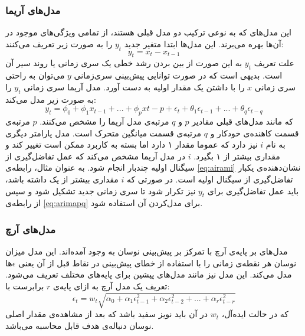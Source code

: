 \subsubsection{مدل‌های آریما}
این مدل‌های که به نوعی ترکیب دو مدل قبلی هستند، از تمامی ویژگی‌های موجود در آن‌ها بهره می‌برند. این مدل‌ها ابتدا متغیر جدید $y_t$ را به صورت زیر تعریف می‌کنند:
\begin{equation}
	\label{eq:airami}
	y_t = x_t - x_{t-1}
\end{equation}
علت تعریف $y_t$  به این صورت از بین بردن رشد خطی یک سری زمانی یا روند سیر آن است. بدیهی است که در صورت توانایی پیش‌بینی سری‌زمانی $y$ می‌توان به راحتی سری زمانی $x$ را با داشتن یک مقدار اولیه به دست آورد. مدل آریما سری زمانی $y_t$ را به صورت زیر مدل می‌کند:
\begin{equation}
	\label{eq:arimapq}
	y_t = \phi_0 + \phi_1 x_{t-1} + ... + \phi_p x{t-p} + \epsilon_t + \theta_1 \epsilon_{t-1} + ... + \theta_q \epsilon_{t-q}
\end{equation}
که مانند مدل‌های قبلی مقادیر $p$ و $q$ مرتبه‌ی مدل آریما را مشخص می‌کنند. $p$ مرتبه‌ی قسمت کاهنده‌ی خودکار و $q$ مرتبه‌ی قسمت میانگین متحرک است. مدل‌ پارامتر دیگری به نام $i$ نیز دارد که عموما مقدار ۱ دارد اما بسته به کاربرد ممکن است تغییر کند و مقداری بیشتر از ۱ بگیرد. $i$ در مدل آریما مشخص می‌کند که عمل تفاضل‌گیری از سیگنال اولیه چندبار انجام شود. به عنوان مثال، رابطه‌ی \ref{eq:airami} نشان‌دهنده‌ی یکبار تفاضل‌گیری از سیگنال اولیه است. در صورتی که $i$ مقداری بیشتر از یک داشته باشد، باید عمل تفاضل‌گیری برای $y_t$ نیز تکرار شود تا سری زمانی جدید تشکیل شود و سپس از رابطه‌ی \ref{eq:arimapq} برای مدل‌کردن آن استفاده شود.
\subsubsection{مدل‌های آرچ}
مدل‌های بر پایه‌ی آرچ با تمرکز بر پیش‌بینی نوسان به وجود آمده‌اند. این مدل میزان نوسان هر نقطه‌ی زمانی را با استفاده از خطای پیش‌بینی در نقاط قبل از آن یعنی $\epsilon$ها مدل‌ می‌کند. این مدل نیز مانند مدل‌های پیشین برای پایه‌های مختلف تعریف می‌شود. تعریف یک مدل آرچ به ازای پایه‌ی $r$ برابرست با:
\begin{equation}
	\epsilon_t = w_t \sqrt{\alpha_0 + \alpha_1 \epsilon_{t-1}^2 + \alpha_2 \epsilon_{t-2}^2 + ... + \alpha_r \epsilon_{t-r}^2}
\end{equation}
که در حالت ایده‌آل، $w_t$ در آن باید نویز سفید باشد که بعد از مشاهده‌ی مقدار اصلی نوسان دنباله‌ی هدف قابل محاسبه می‌باشد.
